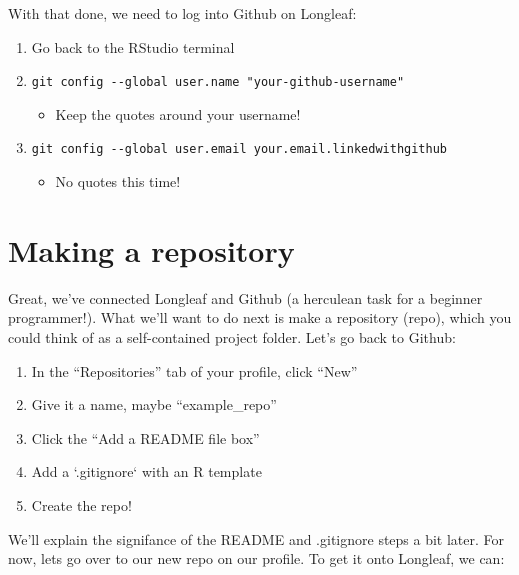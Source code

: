 \documentclass[
  letterpaper,
  DIV=11,
  numbers=noendperiod]{scrreprt}
\providecommand{\tightlist}{%
  \setlength{\itemsep}{0pt}\setlength{\parskip}{0pt}}\usepackage{longtable,booktabs,array}
\begin{document}
With that done, we need to log into Github on Longleaf:

\begin{enumerate}
\def\labelenumi{\arabic{enumi}.}
\item
  Go back to the RStudio terminal
\item
  \texttt{git\ config\ -\/-global\ user.name\ "your-github-username"}

  \begin{itemize}
  \tightlist
  \item
    Keep the quotes around your username!
  \end{itemize}
\item
  \texttt{git\ config\ -\/-global\ user.email\ your.email.linkedwithgithub}

  \begin{itemize}
  \tightlist
  \item
    No quotes this time!
  \end{itemize}
\end{enumerate}

\section{Making a repository}\label{sec-repo}

Great, we've connected Longleaf and Github (a herculean task for a
beginner programmer!). What we'll want to do next is make a repository
(repo), which you could think of as a self-contained project folder.
Let's go back to Github:

\begin{enumerate}
\def\labelenumi{\arabic{enumi}.}
\item
  In the ``Repositories'' tab of your profile, click ``New''
\item
  Give it a name, maybe ``example\_repo''
\item
  Click the ``Add a README file box''
\item
  Add a `.gitignore` with an R template
\item
  Create the repo!
\end{enumerate}

We'll explain the signifance of the README and .gitignore steps a bit
later. For now, lets go over to our new repo on our profile. To get it
onto Longleaf, we can:
\end{document}
